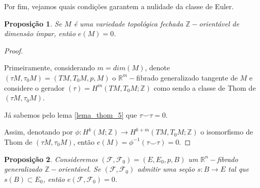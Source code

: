 \documentclass[12pt,oneside]{book} %
\newtheorem{prop}   {\hspace{0.5cm}Proposi\c c\~ao}[chapter]
\newcommand{\R}{\mathbb{R}}
\newcommand{\Z}{\mathbb{Z}}
\newcommand{\ccup}{\smile}
\begin{document}
\par Por fim, vejamos quais condições garantem a nulidade da classe de Euler.

\begin{prop}\label{prop_nulidade_euler}
	Se $M$ é uma variedade topológica fechada $\Z-$orientável de dimensão ímpar, então $e(M)=0$.
\end{prop}
\begin{proof}
	
	\
	
	\par Primeiramente, considerando $m=dim(M)$, denote $(\tau M,\tau_{0}M)=(TM,T_{0}M,p,M)$ o $\R^{m}-$fibrado generalizado tangente de $M$ e considere o gerador $(\tau)=H^{m}(TM,T_{0}M;\Z)$ como sendo a classe de Thom de $(\tau M,\tau_{0}M)$.
	
	\par Já sabemos pelo lema \ref{lema_thom_5} que $\tau\ccup\tau=0$.
	
	\par Assim, denotando por $\phi:H^{k}(M;\Z)\to H^{k+m}(TM,T_{0}M;\Z)$ o isomorfismo de Thom de $(\tau M,\tau_{0}M)$, então $e(M)=\phi^{-1}(\tau\ccup\tau)=0$.
	
\end{proof}

\begin{prop}\label{poincare-hopf}
	Consideremos $(\mathcal{F},\mathcal{F}_{0})=(E,E_{0},p,B)$ um $\R^{n}-$fibrado generalizado $\Z-$orientável. Se $(\mathcal{F},\mathcal{F}_{0})$ admitir uma seção $s:B\to E$ tal que $s(B)\subset E_{0}$, então $e(\mathcal{F},\mathcal{F}_{0})=0$.
\end{prop}
\end{document}
